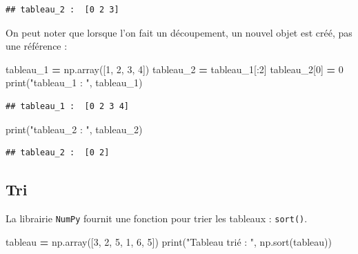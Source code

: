 \documentclass[12pt,]{book}
\newenvironment{Shaded}{\begin{snugshade}}{\end{snugshade}}
\newcommand{\DecValTok}[1]{\textcolor[rgb]{0.00,0.00,0.81}{#1}}
\newcommand{\StringTok}[1]{\textcolor[rgb]{0.31,0.60,0.02}{#1}}
\newcommand{\OperatorTok}[1]{\textcolor[rgb]{0.81,0.36,0.00}{\textbf{#1}}}
\newcommand{\BuiltInTok}[1]{#1}
\newcommand{\NormalTok}[1]{#1}
\numberwithin{equation}{section}
\numberwithin{countremarque}{section}
\begin{document}
\begin{lstlisting}
## tableau_2 :  [0 2 3]
\end{lstlisting}

On peut noter que lorsque l'on fait un découpement, un nouvel objet est
créé, pas une référence :

\begin{Shaded}
\begin{Highlighting}[]
\NormalTok{tableau_1 }\OperatorTok{=}\NormalTok{ np.array([}\DecValTok{1}\NormalTok{, }\DecValTok{2}\NormalTok{, }\DecValTok{3}\NormalTok{, }\DecValTok{4}\NormalTok{])}
\NormalTok{tableau_2 }\OperatorTok{=}\NormalTok{ tableau_1[:}\DecValTok{2}\NormalTok{]}
\NormalTok{tableau_2[}\DecValTok{0}\NormalTok{] }\OperatorTok{=} \DecValTok{0}
\BuiltInTok{print}\NormalTok{(}\StringTok{"tableau_1 : "}\NormalTok{, tableau_1)}
\end{Highlighting}
\end{Shaded}

\begin{lstlisting}
## tableau_1 :  [0 2 3 4]
\end{lstlisting}

\begin{Shaded}
\begin{Highlighting}[]
\BuiltInTok{print}\NormalTok{(}\StringTok{"tableau_2 : "}\NormalTok{, tableau_2)}
\end{Highlighting}
\end{Shaded}

\begin{lstlisting}
## tableau_2 :  [0 2]
\end{lstlisting}

\subsection{Tri}\label{tri-1}

La librairie \texttt{NumPy} fournit une fonction pour trier les tableaux
: \texttt{sort()}.

\begin{Shaded}
\begin{Highlighting}[]
\NormalTok{tableau }\OperatorTok{=}\NormalTok{ np.array([}\DecValTok{3}\NormalTok{, }\DecValTok{2}\NormalTok{, }\DecValTok{5}\NormalTok{, }\DecValTok{1}\NormalTok{, }\DecValTok{6}\NormalTok{, }\DecValTok{5}\NormalTok{])}
\BuiltInTok{print}\NormalTok{(}\StringTok{"Tableau trié : "}\NormalTok{, np.sort(tableau))}
\end{Highlighting}
\end{Shaded}
\end{document}
